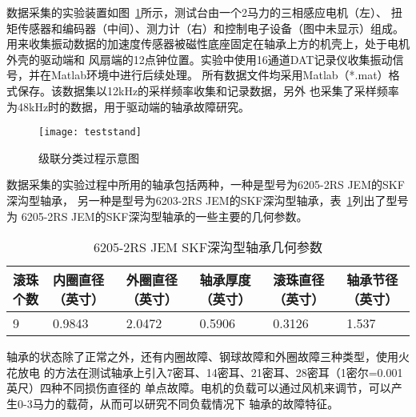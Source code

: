 数据采集的实验装置如图~\ref{fig:teststand}所示，测试台由一个2马力的三相感应电机（左）、
扭矩传感器和编码器（中间）、测力计（右）和控制电子设备（图中未显示）组成。 
用来收集振动数据的加速度传感器被磁性底座固定在轴承上方的机壳上，处于电机外壳的驱动端和
风扇端的12点钟位置。实验中使用16通道DAT记录仪收集振动信号，并在Matlab环境中进行后续处理。
所有数据文件均采用Matlab（*.mat）格式保存。该数据集以12kHz的采样频率收集和记录数据，另外
也采集了采样频率为48kHz时的数据，用于驱动端的轴承故障研究。
\begin{figure}[ht] %
  \centering
  \texttt{[image: teststand]}
  \caption{级联分类过程示意图}
  \label{fig:teststand}
\end{figure}

数据采集的实验过程中所用的轴承包括两种，一种是型号为6205-2RS JEM的SKF深沟型轴承，
另一种是型号为6203-2RS JEM的SKF深沟型轴承，表~\ref{tab:bearing_params}列出了型号为
6205-2RS JEM的SKF深沟型轴承的一些主要的几何参数。
\begin{table}[htb]
  \centering
  \begin{minipage}[t]{0.8\linewidth} %
  \caption{6205-2RS JEM SKF深沟型轴承几何参数}
  \label{tab:bearing_params}
    \begin{tabularx}{\linewidth}{lXXXXX}
      \toprule[1.5pt]
      滚珠个数 & 内圈直径（英寸）& 外圈直径（英寸）& 轴承厚度（英寸）& 滚珠直径（英寸）& 轴承节径（英寸） \\\midrule[1pt]
      9 & 0.9843 & 2.0472 & 0.5906 & 0.3126 & 1.537 \\\bottomrule[1.5pt]
    \end{tabularx}
  \end{minipage}
\end{table}

轴承的状态除了正常之外，还有内圈故障、钢球故障和外圈故障三种类型，使用火花放电
的方法在测试轴承上引入7密耳、14密耳、21密耳、28密耳（1密尔=0.001英尺）四种不同损伤直径的
单点故障。电机的负载可以通过风机来调节，可以产生0-3马力的载荷，从而可以研究不同负载情况下
轴承的故障特征。

